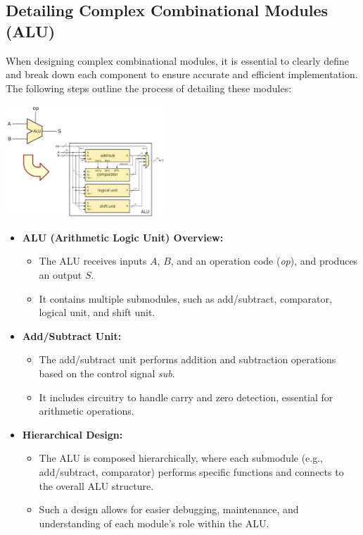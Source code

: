 \subsection{Detailing Complex Combinational Modules (ALU)}
When designing complex combinational modules, it is essential to clearly define and break down each component to ensure accurate and efficient implementation. The following steps outline the process of detailing these modules:
\begin{center}
    \includegraphics[width=0.45\textwidth]{chapters/chapter2a/images/ALU.png}
\end{center}
\begin{itemize}
    \item \textbf{ALU (Arithmetic Logic Unit) Overview:}
    \begin{itemize}
        \item The ALU receives inputs \( A \), \( B \), and an operation code (\textit{op}), and produces an output \( S \).
        \item It contains multiple submodules, such as add/subtract, comparator, logical unit, and shift unit.
    \end{itemize}

    \item \textbf{Add/Subtract Unit:}
    \begin{itemize}
        \item The add/subtract unit performs addition and subtraction operations based on the control signal \textit{sub}. 
        \item It includes circuitry to handle carry and zero detection, essential for arithmetic operations.
    \end{itemize}

    \item \textbf{Hierarchical Design:}
    \begin{itemize}
        \item The ALU is composed hierarchically, where each submodule (e.g., add/subtract, comparator) performs specific functions and connects to the overall ALU structure.
        \item Such a design allows for easier debugging, maintenance, and understanding of each module’s role within the ALU.
    \end{itemize}
\end{itemize}

